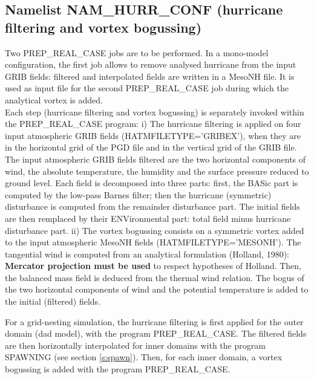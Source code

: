 \subsection{Namelist NAM\_HURR\_CONF (hurricane filtering and vortex bogussing)}
Two PREP\_REAL\_CASE jobs are to be performed.
In a mono-model configuration, the
first job allows to remove analysed hurricane from the input GRIB fields:
filtered and interpolated fields are written in a MesoNH file.
It is used as input file for the second
PREP\_REAL\_CASE job during which the analytical vortex is added.\\

Each step (hurricane filtering and vortex bogussing) is separately invoked
within \\
the PREP\_REAL\_CASE program:
\subitem
i) The hurricane filtering is applied on four input atmospheric GRIB fields
(HATMFILETYPE='GRIBEX'), when they are in the horizontal grid of the PGD file
and in the vertical grid of the GRIB file. The input atmospheric GRIB fields 
filtered are the two horizontal components of wind, the absolute temperature,
the humidity 
and the surface pressure reduced to ground level. Each field is decomposed 
into three parts: first, the BASic part is computed by the low-pass Barnes
filter; then the hurricane (symmetric) disturbance is computed from the 
remainder disturbance part. The initial fields are then remplaced by their 
ENVironmental part: total field minus hurricane disturbance part.
\subitem
ii) The vortex bogussing consists on a symmetric vortex added to the input
atmospheric MesoNH fields (HATMFILETYPE='MESONH'). 
The tangential wind is computed from an analytical formulation (Holland, 1980):
{\bf Mercator projection must be used} to respect hypotheses of Holland.
Then, the balanced mass field is deduced
from the thermal wind relation. The bogus of the two horizontal components of
wind and the potential temperature is added to the initial (filtered) fields.

For a grid-nesting simulation, the hurricane filtering is first applied for
the outer domain (dad model), with the program PREP\_REAL\_CASE.
The filtered fields are then horizontally interpolated for inner domains
with the program SPAWNING (see section \ref{s:spawn}). 
Then, for each inner domain, a vortex bogussing is added with the program
PREP\_REAL\_CASE.


